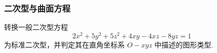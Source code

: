 \subsubsection{二次型与曲面方程}


\begin{example}
    转换一般二次型方程 $$2x^2+5y^2+5z^2+4xy-4xz-8yz=1$$
    为标准二次型，并判定其在直角坐标系 $O-xyz$ 中描述的图形类型.
\end{example}

